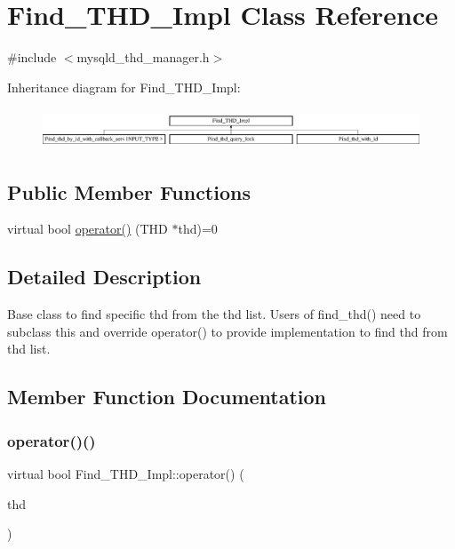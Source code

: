 \hypertarget{classFind__THD__Impl}{}\section{Find\+\_\+\+T\+H\+D\+\_\+\+Impl Class Reference}
\label{classFind__THD__Impl}


{\ttfamily \#include $<$mysqld\+\_\+thd\+\_\+manager.\+h$>$}

Inheritance diagram for Find\+\_\+\+T\+H\+D\+\_\+\+Impl\+:\begin{figure}[H]
\begin{center}
\leavevmode
\includegraphics[height=1.200429cm]{classFind__THD__Impl}
\end{center}
\end{figure}
\subsection*{Public Member Functions}
\begin{DoxyCompactItemize}
\item 
virtual bool \mbox{\hyperlink{classFind__THD__Impl_a9241342847e36bfb0c4d8330df033b4b}{operator()}} (T\+HD $\ast$thd)=0
\end{DoxyCompactItemize}


\subsection{Detailed Description}
Base class to find specific thd from the thd list. Users of find\+\_\+thd() need to subclass this and override operator() to provide implementation to find thd from thd list. 

\subsection{Member Function Documentation}
\mbox{\label{classFind__THD__Impl_a9241342847e36bfb0c4d8330df033b4b}} 
\subsubsection{\texorpdfstring{operator()()}{operator()()}}
{\footnotesize\ttfamily virtual bool Find\+\_\+\+T\+H\+D\+\_\+\+Impl\+::operator() (\begin{DoxyParamCaption}\item[{T\+HD $\ast$}]{thd }\end{DoxyParamCaption})\hspace{0.3cm}{\ttfamily [pure virtual]}}

